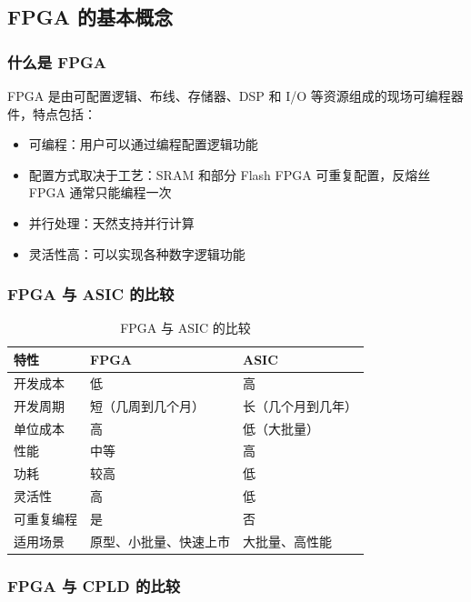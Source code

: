 \subsection{FPGA 的基本概念}

\subsubsection{什么是 FPGA}

FPGA 是由可配置逻辑、布线、存储器、DSP 和 I/O 等资源组成的现场可编程器件，特点包括：
\begin{itemize}
  \item 可编程：用户可以通过编程配置逻辑功能
  \item 配置方式取决于工艺：SRAM 和部分 Flash FPGA 可重复配置，反熔丝 FPGA 通常只能编程一次
  \item 并行处理：天然支持并行计算
  \item 灵活性高：可以实现各种数字逻辑功能
\end{itemize}

\subsubsection{FPGA 与 ASIC 的比较}

\begin{table}[H]
  \centering
  \caption{FPGA 与 ASIC 的比较}
  \begin{tabular}{|l|l|l|}
    \hline
    特性 & FPGA & ASIC \\
    \hline
    开发成本 & 低 & 高 \\
    开发周期 & 短（几周到几个月） & 长（几个月到几年） \\
    单位成本 & 高 & 低（大批量） \\
    性能 & 中等 & 高 \\
    功耗 & 较高 & 低 \\
    灵活性 & 高 & 低 \\
    可重复编程 & 是 & 否 \\
    适用场景 & 原型、小批量、快速上市 & 大批量、高性能 \\
    \hline
  \end{tabular}
\end{table}

\subsubsection{FPGA 与 CPLD 的比较}

